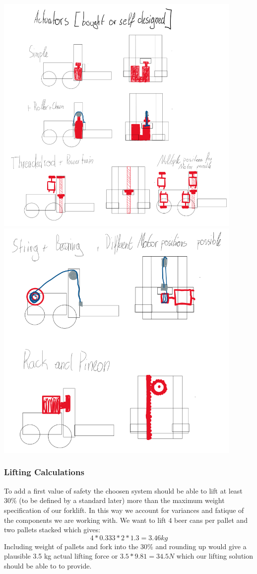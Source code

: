\documentclass[../report.tex]{subfiles}
\begin{document}
\begin{center}
    \includegraphics[width=0.9\textwidth]{../image/Liftsolutions1.png}
    \includegraphics[width=0.9\textwidth]{../image/Liftsolutions2.png}
\end{center}
\subsubsection{Lifting Calculations}
To add a first value of safety the choosen system should be able to lift at least 30\% (to be defined by a standard later) more than the maximum weight
specification of our forklift. In this way we account for variances and fatique of the components we are working 
with.
We want to lift 4 beer cans per pallet and two pallets stacked which gives:
\[ 4*0.333*2*1.3=3.46kg\]
Including weight of pallets and fork into the 30\% and rounding up would give a plausible 3.5 kg actual lifting force or
\(3.5*9.81=34.5N\) which our lifting solution should be able to to provide.
\end{document}
